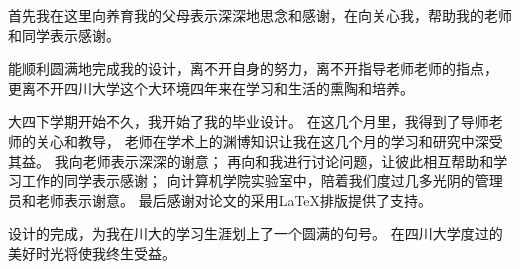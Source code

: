 \announcement

\begin{ack}
首先我在这里向养育我的父母表示深深地思念和感谢，在向关心我，帮助我的老师和同学表示感谢。

能顺利圆满地完成我的设计，离不开自身的努力，离不开指导老师\teacher{}老师的指点，
更离不开四川大学这个大环境四年来在学习和生活的熏陶和培养。

大四下学期开始不久，我开始了我的毕业设计。
在这几个月里，我得到了导师\teacher{}老师的关心和教导，
\teacher{}老师在学术上的渊博知识让我在这几个月的学习和研究中深受其益。
我向\teacher{}老师表示深深的谢意；
再向和我进行讨论问题，让彼此相互帮助和学习工作的同学表示感谢；
向计算机学院实验室中，陪着我们度过几多光阴的管理员和老师表示谢意。
最后感谢\scuthesis{}对论文的采用\LaTeX{}排版提供了支持。

设计的完成，为我在川大的学习生涯划上了一个圆满的句号。
在四川大学度过的美好时光将使我终生受益。
\end{ack}